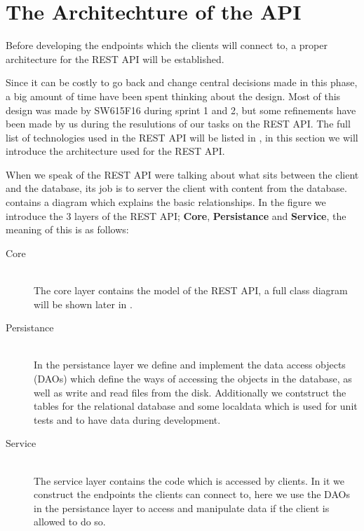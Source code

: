 \section{The Architechture of the API}\label{architechture}
Before developing the endpoints which the clients will connect to, a proper architecture for the REST API will be established. 


Since it can be costly to go back and change central decisions made in this phase, a big amount of time have been spent thinking about the design. 
Most of this design was made by SW615F16 during sprint 1 and 2, but some refinements have been made by us during the resulutions of our tasks on the REST API. 
The full list of technologies used in the REST API will be listed in , in this section we will introduce the architecture used for the REST API. 

When we speak of the REST API were talking about what sits between the client and the database, its job is to server the client with content from the database. 
 contains a diagram which explains the basic relationships. 
In the figure we introduce the 3 layers of the REST API; \textbf{Core}, \textbf{Persistance} and \textbf{Service}, the meaning of this is as follows:
\begin{description}
    \item[Core] \hfill \\ 
    The core layer contains the model of the REST API, a full class diagram will be shown later in .

    \item[Persistance] \hfill \\ 
    In the persistance layer we define and implement the data access objects (DAOs) which define the ways of accessing the objects in the database, as well as write and read files from the disk. 
    Additionally we contstruct the tables for the relational database and some localdata which is used for unit tests and to have data during development. 

    \item[Service] \hfill \\ 
    The service layer contains the code which is accessed by clients.
    In it we construct the endpoints the clients can connect to, here we use the DAOs in the persistance layer to access and manipulate data if the client is allowed to do so. 
\end{description}

